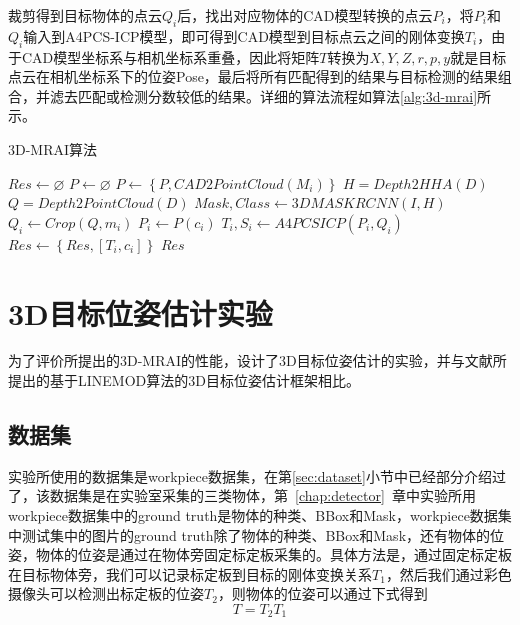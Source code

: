 裁剪得到目标物体的点云$Q_i$后，找出对应物体的CAD模型转换的点云$P_i$，将$P_i$和$Q_i$输入到A4PCS-ICP模型，即可得到CAD模型到目标点云之间的刚体变换$T_i$，由于CAD模型坐标系与相机坐标系重叠，因此将矩阵$T$转换为$X,Y,Z,r,p,y$就是目标点云在相机坐标系下的位姿Pose，最后将所有匹配得到的结果与目标检测的结果组合，并滤去匹配或检测分数较低的结果。详细的算法流程如算法\ref{alg:3d-mrai}所示。
\begin{algorithm}
  \caption{3D-MRAI算法}
  \label{alg:3d-mrai}
  $Res\leftarrow \varnothing$\;
  $P\leftarrow \varnothing$\;
   {
    $P\leftarrow \left\{P, CAD2PointCloud(M_i)\right\}$\;
  }
  $H = Depth2HHA(D)$\;
  $Q = Depth2PointCloud(D)$\;
  $Mask, Class \leftarrow 3DMASKRCNN(I, H)$
   {
    $Q_i \leftarrow Crop(Q, m_i)$\;
    $P_i \leftarrow P(c_i)$\;
    $T_i,S_i\leftarrow A4PCSICP(P_i, Q_i)$\;
     {
      $Res\leftarrow \left\{Res, \left[T_i, c_i\right]\right\}$\;
    }
  }
  \Return $Res$
\end{algorithm}

\section{3D目标位姿估计实验}
为了评价所提出的3D-MRAI的性能，设计了3D目标位姿估计的实验，并与文献\cite{hinterstoisser2012model}所提出的基于LINEMOD算法的3D目标位姿估计框架相比。
\subsection{数据集}
实验所使用的数据集是workpiece数据集，在第\ref{sec:dataset}小节中已经部分介绍过了，该数据集是在实验室采集的三类物体，第~\ref{chap:detector}~章中实验所用workpiece数据集中的ground truth是物体的种类、BBox和Mask，workpiece数据集中测试集中的图片的ground truth除了物体的种类、BBox和Mask，还有物体的位姿，物体的位姿是通过在物体旁固定标定板采集的。具体方法是，通过固定标定板在目标物体旁，我们可以记录标定板到目标的刚体变换关系$T_1$，然后我们通过彩色摄像头可以检测出标定板的位姿$T_2$，则物体的位姿可以通过下式得到
\begin{equation}
  T = T_2T_1
\end{equation}

